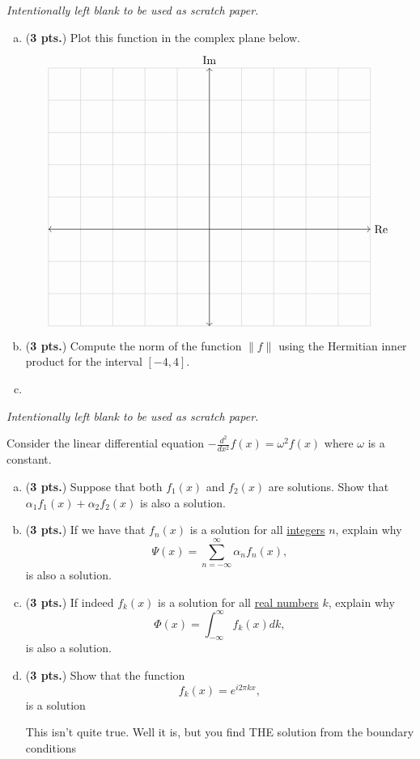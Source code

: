 \documentclass[12pt]{amsbook}
\begin{document}
\newpage
\emph{Intentionally left blank to be used as scratch paper.}\\


\newpage
\begin{problem}
\begin{enumerate}[(a)] Consider the function $f\colon [-4,4] \to \C$ given by $f(x) = x+i|x|$.
	\item (\textbf{3 pts.}) Plot this function in the complex plane below.
		\[
		        \begin{tikzpicture}[scale=1]
		        \draw[thin,gray!40] (-5,-3) grid (5,5);
		        \draw[<->] (-5,0)--(5,0) node[right]{$\RE$};
		        \draw[<->] (0,-3)--(0,5) node[above]{$\IM$};
		        \end{tikzpicture}
		  \]
	\item (\textbf{3 pts.}) Compute the norm of the function $\|f\|$ using the Hermitian inner product for the interval $[-4,4]$.
	\item 
\end{enumerate}
\end{problem}

\newpage
\emph{Intentionally left blank to be used as scratch paper.}\\


\newpage
\begin{problem} Consider the linear differential equation $-\frac{d^2}{dx^2}f(x)=\omega^2f(x)$ where $\omega$ is a constant.
\begin{enumerate}[(a)]
	\item	(\textbf{3 pts.}) Suppose that both $f_1(x)$ and $f_2(x)$ are solutions. Show that $\alpha_1f_1(x)+\alpha_2 f_2(x)$ is also a solution.
	\item	(\textbf{3 pts.}) If we have that $f_n(x)$ is a solution for all \underline{integers} $n$, explain why 
	\[
	\Psi(x) = \sum_{n=-\infty}^\infty \alpha_n f_n(x),
	\]
	is also a solution.
	\item	(\textbf{3 pts.}) If indeed $f_k(x)$ is a solution for all \underline{real numbers} $k$, explain why 
	\[
	\Phi(x) = \int_{-\infty}^\infty f_k(x) dk,
	\]
	is also a solution.
	\item	(\textbf{3 pts.}) Show that the function 
	\[
	f_k(x) = e^{i2\pi kx},
	\]
	is a solution
	
	This isn't quite true. Well it is, but you find THE solution from the boundary conditions
\end{enumerate}
\end{problem}
\end{document}
